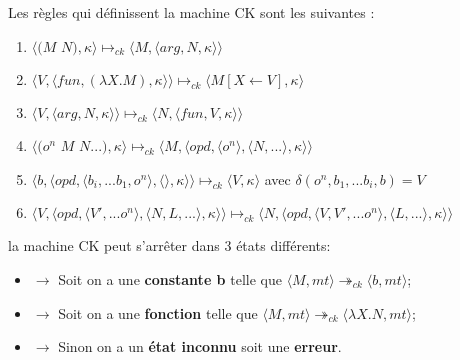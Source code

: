 \documentclass[10pt,a4paper]{report}
\begin{document}
Les règles qui définissent la machine CK sont les suivantes :
\begin{enumerate}
\item $\langle(M$ $N),\kappa\rangle \longmapsto_{ck} \langle M,\langle arg,N,\kappa\rangle\rangle$
\item $\langle V,\langle fun,(\lambda X.M),\kappa \rangle \rangle \longmapsto_{ck} \langle M[X \leftarrow V],\kappa\rangle$
\item $\langle V,\langle arg,N,\kappa \rangle \rangle \longmapsto_{ck} \langle N,\langle fun,V,\kappa \rangle \rangle$
\item $\langle(o^{n}$ $M$ $N...),\kappa\rangle \longmapsto_{ck} \langle M,\langle opd,\langle o^{n}\rangle,\langle N,...\rangle,\kappa\rangle\rangle$
\item $\langle b,\langle opd,\langle b_{i},...b_{1},o^{n}\rangle,\langle\rangle,\kappa\rangle\rangle \longmapsto_{ck} \langle V,\kappa\rangle$ avec $\delta(o^{n},b_{1},...b_{i},b) = V$
\item $\langle V,\langle opd,\langle V',...o^{n}\rangle,\langle N,L,...\rangle,\kappa\rangle\rangle \longmapsto_{ck} \langle N,\langle opd,\langle V,V',...o^{n}\rangle,\langle L,...\rangle,\kappa\rangle\rangle$
\end{enumerate}
\bigbreak


la machine CK peut s'arrêter dans 3 états différents:
\begin{itemize}
\item[]$\longrightarrow$ Soit on a une \textbf{constante b} telle que $\langle M,mt\rangle \twoheadrightarrow_{ck} \langle b,mt\rangle$;
\item[]$\longrightarrow$ Soit on a une \textbf{fonction} telle que $\langle M,mt\rangle \twoheadrightarrow_{ck} \langle\lambda X.N,mt\rangle$;
\item[]$\longrightarrow$ Sinon on a un \textbf{état inconnu} soit une \textbf{erreur}.
\end{itemize}
\bigbreak
\end{document}
